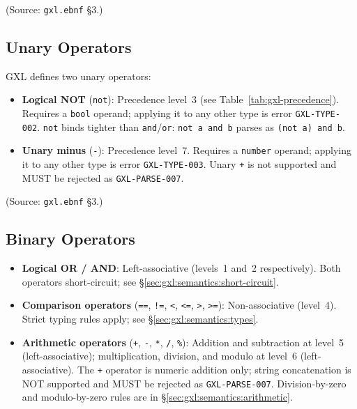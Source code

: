 (Source: \texttt{gxl.ebnf} \S3.)

\subsection{Unary Operators}
\label{subsec:gxl:unary}

GXL defines two unary operators:

\begin{itemize}
  \item \textbf{Logical NOT} (\texttt{not}):
    Precedence level~3 (see Table~\ref{tab:gxl-precedence}).
    Requires a \texttt{bool} operand; applying it to any other type is
    error \texttt{GXL-TYPE-002}.
    \texttt{not} binds tighter than \texttt{and}/\texttt{or}:
    \texttt{not a and b} parses as \texttt{(not a) and b}.

  \item \textbf{Unary minus} (\texttt{-}):
    Precedence level~7.
    Requires a \texttt{number} operand; applying it to any other type is
    error \texttt{GXL-TYPE-003}.
    Unary \texttt{+} is not supported and MUST be rejected as
    \texttt{GXL-PARSE-007}.
\end{itemize}

(Source: \texttt{gxl.ebnf} \S3.)

\subsection{Binary Operators}
\label{subsec:gxl:binary}

\begin{itemize}
  \item \textbf{Logical OR / AND}:
    Left-associative (levels~1 and~2 respectively).
    Both operators short-circuit; see \S\ref{sec:gxl:semantics:short-circuit}.

  \item \textbf{Comparison operators}
    (\texttt{==}, \texttt{!=}, \texttt{<}, \texttt{<=}, \texttt{>}, \texttt{>=}):
    Non-associative (level~4).
    Strict typing rules apply; see \S\ref{sec:gxl:semantics:types}.

  \item \textbf{Arithmetic operators}
    (\texttt{+}, \texttt{-}, \texttt{*}, \texttt{/}, \texttt{\%}):
    Addition and subtraction at level~5 (left-associative);
    multiplication, division, and modulo at level~6 (left-associative).
    The \texttt{+} operator is numeric addition only;
    string concatenation is NOT supported and MUST be rejected as
    \texttt{GXL-PARSE-007}.
    Division-by-zero and modulo-by-zero rules are in
    \S\ref{sec:gxl:semantics:arithmetic}.
\end{itemize}

